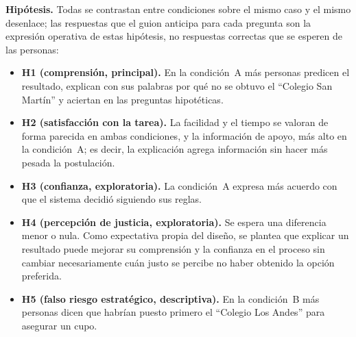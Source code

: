\textbf{Hipótesis.} Todas se contrastan entre condiciones sobre el mismo caso y el mismo desenlace; las respuestas que el guion anticipa para cada pregunta son la expresión operativa de estas hipótesis, no respuestas correctas que se esperen de las personas:
\begin{itemize}
    \item \textbf{H1 (comprensión, principal).} En la condición~A más personas predicen el resultado, explican con sus palabras por qué no se obtuvo el ``Colegio San Martín'' y aciertan en las preguntas hipotéticas.
    \item \textbf{H2 (satisfacción con la tarea).} La facilidad y el tiempo se valoran de forma parecida en ambas condiciones, y la información de apoyo, más alto en la condición~A; es decir, la explicación agrega información sin hacer más pesada la postulación.
    \item \textbf{H3 (confianza, exploratoria).} La condición~A expresa más acuerdo con que el sistema decidió siguiendo sus reglas.
    \item \textbf{H4 (percepción de justicia, exploratoria).} Se espera una diferencia menor o nula. Como expectativa propia del diseño, se plantea que explicar un resultado puede mejorar su comprensión y la confianza en el proceso sin cambiar necesariamente cuán justo se percibe no haber obtenido la opción preferida.
    \item \textbf{H5 (falso riesgo estratégico, descriptiva).} En la condición~B más personas dicen que habrían puesto primero el ``Colegio Los Andes'' para asegurar un cupo.
\end{itemize}

